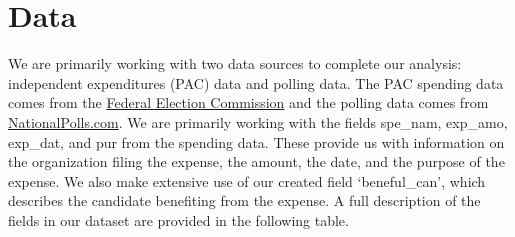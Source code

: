 \documentclass[11pt]{article}\usepackage{graphicx, color}
\begin{document}
\section{Data}
We are primarily working with two data sources to complete our analysis: independent expenditures (PAC) data and polling data. The PAC spending data comes from the \href{http://www.fec.gov/data/IndependentExpenditure.do?format=html&cf=superPAC}{Federal Election Commission} and the polling data comes from \href{http://nationalpolls.com/}{NationalPolls.com}.  We are primarily working with the fields spe\_nam, exp\_amo, exp\_dat, and pur from the spending data.  These provide us with information on the organization filing the expense, the amount, the date, and the purpose of the expense.  We also make extensive use of our created field `beneful\_can', which describes the candidate benefiting from the expense.  A full description of the fields in our dataset are provided in the following table.
\end{document}
